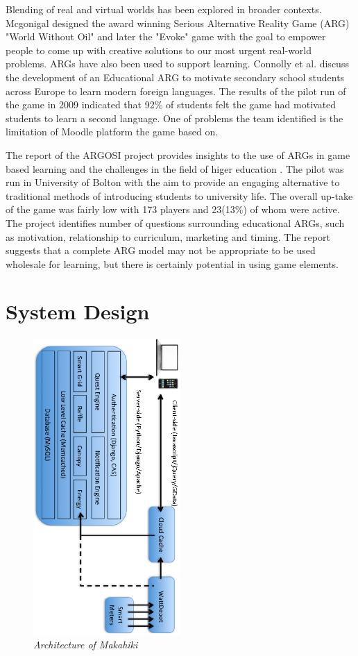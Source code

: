\documentclass{acm_proc_article-sp}
\begin{document}
Blending of real and virtual worlds has been explored in broader contexts. 
Mcgonigal designed the award winning Serious Alternative Reality Game (ARG) 
"World Without Oil"\cite{worldwithoutoil} and later the "Evoke"
\cite{urgentevoke} game with the goal to empower people to come up with
creative solutions to our most urgent real-world problems. ARGs have also been
used to support learning. Connolly et al. discuss the development of an 
Educational ARG to motivate secondary school students across Europe to learn 
modern foreign languages\cite{connolly2009arguing}. The results of the pilot 
run of the game in 2009 indicated that 92\% of students felt the game had  
motivated students to learn a second language. One of problems
the team identified is the limitation of Moodle platform the game based on.

The report of the ARGOSI project provides insights to the use of ARGs in game
based learning and the challenges in the field of higer education
\cite{whitton2009alternate}. The pilot was run in University of Bolton with 
the aim to provide an engaging alternative to traditional methods of 
introducing students to university life. The overall up-take of the game was 
fairly low with 173 players and 23(13\%) of whom were active. The project
identifies number of questions surrounding educational ARGs, such as 
motivation, relationship to curriculum, marketing and timing. The report 
suggests that a complete ARG model may not be appropriate to be used wholesale
for learning, but there is certainly potential in using game elements.

\section{System Design}
\begin{figure}[t!]
  \center
  \includegraphics[width=0.5\textwidth, angle=90]{makahiki-architecture.eps}
  \caption{\em \small Architecture of Makahiki}
  \label{fig:MakahikiArchitecture}
\end{figure}
\end{document}
